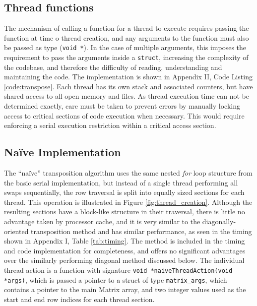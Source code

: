 \documentclass[10 pt, conference]{cssconf}
\begin{document}
\begin{multicols}{2}
\subsection{Thread functions}
The mechanism of calling a function for a thread to execute requires passing the function at time o thread creation, and any arguments to the function must also be passed as type (\verb|void *|). In the case of multiple arguments, this imposes the requirement to pass the arguments inside a \verb|struct|, increasing the complexity of the codebase, and therefore the difficulty of reading, understanding and maintaining the code. The implementation is shown in Appendix II, Code Listing \ref{code:transpose}. Each thread has its own stack and associated counters, but have shared access to all open memory and files. As thread execution time can not be determined exactly, care must be taken to prevent errors by manually locking access to critical sections of code execution when necessary. This would require enforcing a serial execution restriction within a critical access section. 

\subsection{Na\"ive Implementation}
The ``na\"ive'' transposition algorithm uses the same nested \textit{for} loop structure from the basic serial implementation, but instead of a single thread performing all swaps sequentially, the row traversal is split into equally sized sections for each thread. This operation is illustrated in Figure \ref{fig:thread_creation}. Although the resulting sections have a block-like structure in their traversal, there is little no advantage taken by processor cache, and it is very similar to the diagonally-oriented transposition method and has similar performance, as seen in the timing shown in Appendix I, Table \ref{tab:timing}. The method is included in the timing and code implementation for completeness, and offers no significant advantages over the similarly performing diagonal method discussed below. The individual thread action is a function with signature \verb|void *naiveThreadAction(void *args)|, which is passed a pointer to a struct of type \verb|matrix_args|, which contains a pointer to the main Matrix array, and two integer values used as the start and end row indices for each thread section.


\end{multicols}
\end{document}
